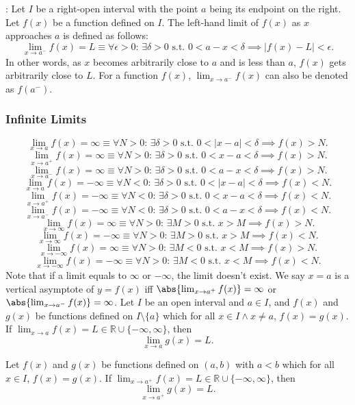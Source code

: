 \documentclass[a4paper,12pt]{report}
\begin{document}
: Let \(I\) be a right-open interval with the point \(a\) being its endpoint on the right. Let \( f(x) \) be a function defined on \(I\). The left-hand limit of \( f(x) \) as \( x \) approaches \( a \) is defined as follows:
\[\lim_{x \to a^-} f(x) = L \equiv \forall \epsilon > 0 :\,\exists \delta > 0 \text{\ s.t.\ } 0 < a - x < \delta \implies |f(x) - L| < \epsilon.\]
In other words, as \(x\) becomes arbitrarily close to \(a\) and is less than \(a\), \(f(x)\) gets arbitrarily close to \(L\). For a function $f(x)$, $\lim_{x\to a^-}f(x)$ can also be denoted as $f(a^-)$.
\subsubsection{Infinite Limits}
\[\lim_{x\to a}f(x)=\infty \equiv \forall N > 0:\, \exists \delta > 0 \text{\ s.t.\ } 0 < |x - a| < \delta \implies f(x) > N.\]
\[\lim_{x\to a^+}f(x)=\infty \equiv \forall N > 0:\, \exists \delta > 0 \text{\ s.t.\ } 0 < x - a < \delta \implies f(x) > N.\]
\[\lim_{x\to a^-}f(x)=\infty \equiv \forall N > 0:\, \exists \delta > 0 \text{\ s.t.\ } 0 < a - x < \delta \implies f(x) > N.\]
\[\lim_{x\to a}f(x)=-\infty \equiv \forall N < 0:\, \exists \delta > 0 \text{\ s.t.\ } 0 < |x - a| < \delta \implies f(x) < N.\]
\[\lim_{x\to a^+}f(x)=-\infty \equiv \forall N < 0:\, \exists \delta > 0 \text{\ s.t.\ } 0 < x - a < \delta \implies f(x) < N.\]
\[\lim_{x\to a^-}f(x)=-\infty \equiv \forall N < 0:\, \exists \delta > 0 \text{\ s.t.\ } 0 < a - x < \delta \implies f(x) < N.\]
\[\lim_{x\to\infty}f(x)=\infty \equiv \forall N > 0:\, \exists M > 0 \text{\ s.t.\ } x > M \implies f(x) > N.\]
\[\lim_{x\to\infty}f(x)=-\infty \equiv \forall N > 0:\, \exists M > 0 \text{\ s.t.\ } x > M \implies f(x) < N.\]
\[\lim_{x\to-\infty}f(x)=\infty \equiv \forall N > 0:\, \exists M < 0 \text{\ s.t.\ } x < M \implies f(x) > N.\]
\[\lim_{x\to-\infty}f(x)=-\infty \equiv \forall N > 0:\, \exists M < 0 \text{\ s.t.\ } x < M \implies f(x) < N.\]
Note that if a limit equals to $\infty$ or $-\infty$, the limit doesn't exist.
We say $x=a$ is a vertical asymptote of $y=f(x)$ iff $\abs{\lim_{x \to a^+} f(x)}=\infty$ or $\abs{\lim_{x \to a^-} f(x)}=\infty$.
Let $I$ be an open interval and $a\in I$, and $f(x)$ and $g(x)$ be functions defined on $I\setminus\{a\}$ which for all $x\in I\land x\neq a$, $f(x)=g(x)$. If $\lim_{x\to a}f(x)=L\in\mathbb{R}\cup\{-\infty,\infty\}$, then
\[\lim_{x\to a}g(x)=L.\]

Let $f(x)$ and $g(x)$ be functions defined on $(a,b)$ with $a<b$ which for all $x\in I$, $f(x)=g(x)$. If $\lim_{x\to a^+}f(x)=L\in\mathbb{R}\cup\{-\infty,\infty\}$, then
\[\lim_{x\to a^+}g(x)=L.\]
\end{document}
